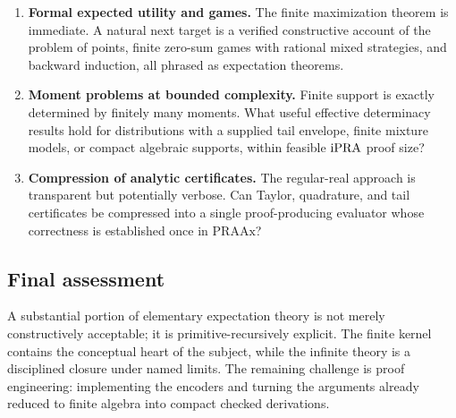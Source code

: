 \begin{enumerate}
\item \textbf{Formal expected utility and games.}
  The finite maximization theorem is immediate.  A natural next target is a
  verified constructive account of the problem of points, finite zero-sum
  games with rational mixed strategies, and backward induction, all phrased as
  expectation theorems.

\item \textbf{Moment problems at bounded complexity.}
  Finite support is exactly determined by finitely many moments.  What useful
  effective determinacy results hold for distributions with a supplied tail
  envelope, finite mixture models, or compact algebraic supports, within
  feasible \(\mathrm{iPRA}\) proof size?

\item \textbf{Compression of analytic certificates.}
  The regular-real approach is transparent but potentially verbose.  Can
  Taylor, quadrature, and tail certificates be compressed into a single
  proof-producing evaluator whose correctness is established once in
  \(\mathrm{PRAAx}\)?
\end{enumerate}

\subsection{Final assessment}

A substantial portion of elementary expectation theory is not merely
constructively acceptable; it is primitive-recursively explicit.  The finite
kernel contains the conceptual heart of the subject, while the infinite theory
is a disciplined closure under named limits.  The remaining challenge is
proof engineering: implementing the encoders and turning the arguments already
reduced to finite algebra into compact checked  derivations.
